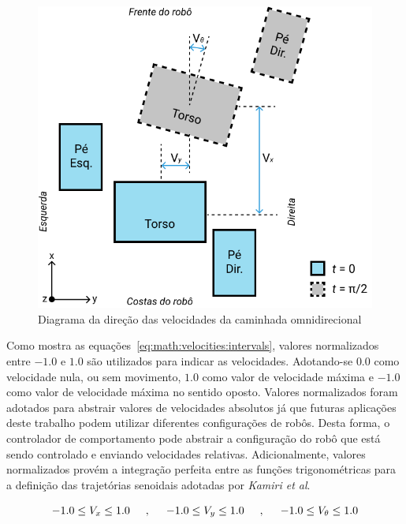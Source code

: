 \begin{figure}[htb]
	\centering
	\includegraphics[scale=1]{imagens/svg/velocities-diagram}
	\caption{Diagrama da direção das velocidades da caminhada omnidirecional}
	\label{fig:math:velocities}
\end{figure}

Como mostra as equações~\ref{eq:math:velocities:intervals}, valores normalizados entre $-1.0$ e $1.0$ são utilizados para indicar as velocidades. Adotando-se $0.0$ como velocidade nula, ou sem movimento, $1.0$ como valor de velocidade máxima e $-1.0$ como valor de velocidade máxima no sentido oposto. Valores normalizados foram adotados para abstrair valores de velocidades absolutos já que futuras aplicações deste trabalho podem utilizar diferentes configurações de robôs. Desta forma, o controlador de comportamento pode abstrair a configuração do robô que está sendo controlado e enviando velocidades relativas. Adicionalmente, valores normalizados provém a integração perfeita entre as funções trigonométricas para a definição das trajetórias senoidais adotadas por \textit{Kamiri et al}.

\begin{equation}
\label{eq:math:velocities:intervals}
-1.0 \leq V_x \leq 1.0
\hspace{5mm},\hspace{5mm}
-1.0 \leq V_y \leq 1.0
\hspace{5mm},\hspace{5mm}
-1.0 \leq V_\theta \leq 1.0
\end{equation}

